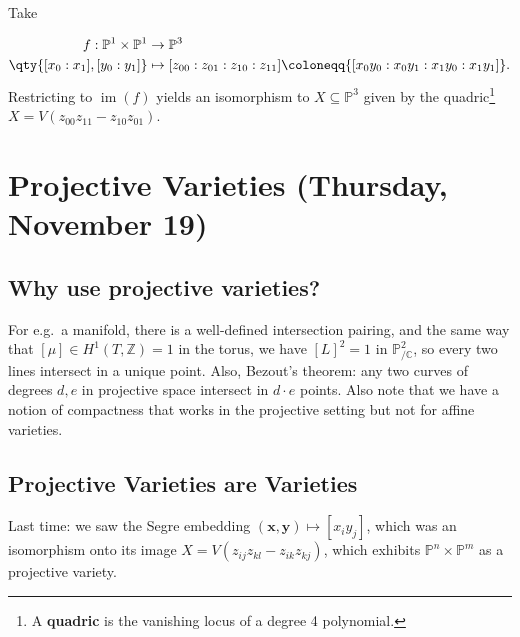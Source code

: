 \begin{example}

Take

\begin{align*}  
f: {\mathbb{P}}^1 \times{\mathbb{P}}^1 &\to {\mathbb{P}}^3 \\
\qty{ {\left[ {x_0: x_1} \right]}, {\left[ {y_0: y_1} \right]}} &\mapsto {\left[ {z_{00} : z_{01} : z_{10} : z_{11} } \right]} \coloneqq{\left[ {x_0 y_0: x_0 y_1 : x_1 y_0 : x_1 y_1} \right]}
.\end{align*}
Restricting to \(\operatorname{im}(f)\) yields an isomorphism to
\(X \subseteq {\mathbb{P}}^3\) given by the quadric\footnote{A
  \textbf{quadric} is the vanishing locus of a degree 4 polynomial.}
\(X = V(z_{00} z_{11} - z_{10} z_{01} )\).

\end{example}

\hypertarget{projective-varieties-thursday-november-19}{%
\section{Projective Varieties (Thursday, November
19)}\label{projective-varieties-thursday-november-19}}

\hypertarget{why-use-projective-varieties}{%
\subsection{Why use projective
varieties?}\label{why-use-projective-varieties}}

For e.g.~a manifold, there is a well-defined intersection pairing, and
the same way that \([\mu] \in H^1(T, {\mathbb{Z}}) = 1\) in the torus,
we have \([L]^2 = 1\) in \({\mathbb{P}}^2_{/{\mathbb{C}}}\), so every
two lines intersect in a unique point. Also, Bezout's theorem: any two
curves of degrees \(d, e\) in projective space intersect in \(d\cdot e\)
points. Also note that we have a notion of compactness that works in the
projective setting but not for affine varieties.

\hypertarget{projective-varieties-are-varieties}{%
\subsection{Projective Varieties are
Varieties}\label{projective-varieties-are-varieties}}

Last time: we saw the Segre embedding
\((\mathbf{x}, \mathbf{y})\mapsto [x_i y_j]\), which was an isomorphism
onto its image \(X = V(z_{ij}z_{kl} - z_{ik} z_{kj} )\), which exhibits
\({\mathbb{P}}^n \times{\mathbb{P}}^m\) as a projective variety.

